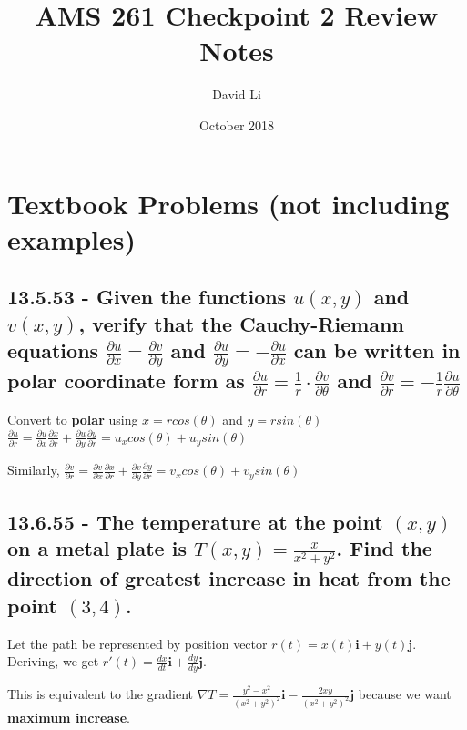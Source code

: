\documentclass{article}
\title{AMS 261 Checkpoint 2 Review Notes}
\author{David Li}
\date{October 2018}
\begin{document}
\maketitle

\section{Textbook Problems (not including examples)}
\subsection{13.5.53 - Given the functions $u(x, y)$ and $v(x, y)$, verify that the Cauchy-Riemann equations $\frac{\partial u}{\partial x} = \frac{\partial v}{\partial y}$ and $\frac{\partial u}{\partial y} = -\frac{\partial u}{\partial x}$ can be written in polar coordinate form as $\frac{\partial u}{\partial r} = \frac{1}{r} \cdot \frac{\partial v}{\partial\theta}$ and $\frac{\partial v}{\partial r} = -\frac{1}{r}\frac{\partial u}{\partial\theta}$}

\par\noindent\Large Convert to \textbf{polar} using $x = rcos(\theta)$ and $y = rsin(\theta)$ $\frac{\partial u}{\partial r} = \frac{\partial u}{\partial x}\frac{\partial x}{\partial r} + \frac{\partial u}{\partial y}\frac{\partial y}{\partial r} = u_{x}cos(\theta) + u_{y}sin(\theta)$\vspace{0.25cm}

\par\noindent\Large Similarly, $\frac{\partial v}{\partial r} = \frac{\partial v}{\partial x}\frac{\partial x}{\partial r} + \frac{\partial v}{\partial y}\frac{\partial y}{\partial r} = v_{x}cos(\theta) + v_{y}sin(\theta)$

\subsection{13.6.55 - The temperature at the point $(x, y)$ on a metal plate is $T(x, y) = \frac{x}{x^{2} + y^{2}}$.  Find the direction of greatest increase in heat from the point $(3, 4)$.}

\par\noindent\large Let the path be represented by position vector $r(t) = x(t)\textbf{i} + y(t)\textbf{j}$.  Deriving, we get $r'(t) = \frac{dx}{dt}\textbf{i} + \frac{dy}{dy}\textbf{j}$.  
\par\noindent\Large This is equivalent to the gradient $\nabla T = \frac{y^{2} - x^{2}}{(x^{2} + y^{2})^{2}}\textbf{i} - \frac{2xy}{(x^{2} + y^{2})^{2}}\textbf{j}$ because we want \textbf{maximum increase}.\vspace{0.25cm}
\end{document}
